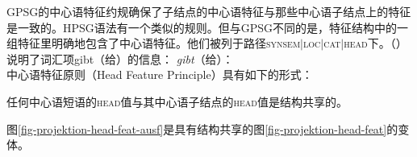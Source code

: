 GPSG\indexgpsgc 的中心语特征约规确保了子结点的中心语特征与那些中心语子结点上的特征是一致的。HPSG语法有一个类似的规则。但与GPSG不同的是，特征结构中的一组特征里明确地包含了中心语特征。他们被列于路径\textsc{synsem$|$loc$|$cat$|$head}下。（）说明了词汇项gibt（给）的信息：
\eas
\emph{gibt}（给）：\\
\zs
中心语特征原则（Head Feature Principle）具有如下的形式：
\begin{principle-break}[中心语特征原则]
\label{prinzip-hfp}
任何中心语短语的\textsc{head}值与其中心语子结点的\textsc{head}值是结构共享的。
\end{principle-break}
图\ref{fig-projektion-head-feat-ausf}是具有结构共享的图\ref{fig-projektion-head-feat}的变体。
